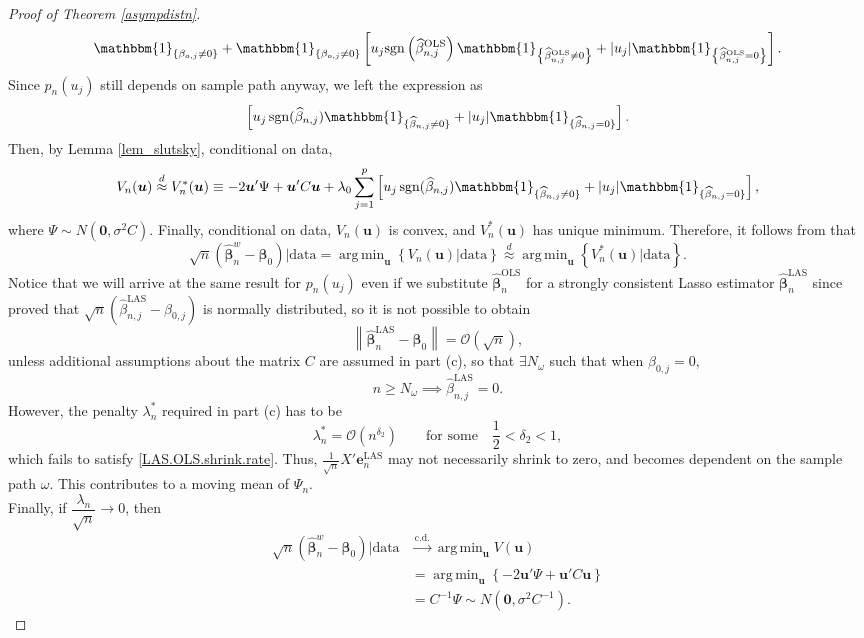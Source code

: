 \documentclass[12pt]{article}
\DeclareMathOperator*{\argmin}{arg\,min} %
\newcommand{\bnw}{\widehat{\bm{\beta}}_n^w} %
\newcommand{\bLAS}{\widehat{\bm{\beta}}_n^{\text{LAS}}} %
\newcommand{\bLS}{\widehat{\bm{\beta}}_n^{\text{OLS}}} %
\newcommand{\be}{\bm{\beta}} %
\newcommand{\dqn}{\frac{1}{\sqrt{n}}} %
\newcommand{\CONV}[1]{\stackrel{\text{#1}}{\longrightarrow}} %
\newcommand{\bu}{\bm{u}} %
\begin{document}
\begin{proof} [Proof of Theorem \ref{asympdistn}]
$$	\mathbbm{1}_{ 
		\left\{ 
		\beta_{o,j} \neq 0 
		\right\} 
	} + 
	\mathbbm{1}_{ 
				\left\{ 
						\beta_{o,j} \neq 0 
				\right\} 
				}
	\left[
		u_j \text{sgn} 
		\left( \widehat{\beta}_{n,j}^{\text{OLS}} \right)
		\mathbbm{1}_{ 
					\left\{ 
						\widehat{\beta}_{n,j}^{\text{OLS}} \neq 0 
					\right\} 
					}
		+ |u_j| 
		\mathbbm{1}_{ 
					\left\{ 
						\widehat{\beta}_{n,j}^{\text{OLS}} = 0 
					\right\} 
					} 
	\right].
	$$
	Since $p_n(u_j)$ still depends on sample path anyway, we left the expression as
	$$
	\left[
		u_j \, \text{sgn}(\widehat{\beta}_{n,j}) 
		\mathbbm{1}_{ \{ \widehat{\beta}_{n,j} \neq 0 \}}
		+ | u_j | \mathbbm{1}_{ \{ \widehat{\beta}_{n,j} = 0 \}} 
	\right].
	$$  
	Then, by Lemma \ref{lem_slutsky}, conditional on data, 
	$$
	V_n(\bu) \stackrel{d}{\approx}  V_n^*(\bu) \equiv 
	-2 \bu' \Psi 
	+ \bu' C \bu
	+ \lambda_0 
	  \sum_{j=1}^p
	  \left[
	  	u_j \, \text{sgn}(\widehat{\beta}_{n,j}) 
	 	 \mathbbm{1}_{ \{ \widehat{\beta}_{n,j} \neq 0 \}}
	  	+ | u_j | \mathbbm{1}_{ \{ \widehat{\beta}_{n,j} = 0 \}} 
	  \right], 
	$$
	where $\Psi \sim N \left( \bm{0}, \sigma^2 C \right)$. Finally, conditional on data, $V_n(\bu)$ is convex, and $V_n^*(\bu)$ has unique minimum. Therefore, it follows from \citet{Geyer1996} that
	$$
	\sqrt{n} \left( \bnw - \be_0 \right) \bigg| \text{data}
	= \argmin_{\bu} \left\{ V_n(\bu) \big| \text{data} \right\}
		\stackrel{d}{\approx}
		\argmin_{\bu} 
		\left\{
				V_n^*(\bu) 
				\big| \text{data}
		\right\}.
	$$ 
	Notice that we will arrive at the same result for $p_n(u_j)$ even if we substitute $\bLS$ for a strongly consistent Lasso estimator $\bLAS$ since \citet{Knight&Fu} proved that $\sqrt{n} \left( \widehat{\beta}_{n,j}^{\text{LAS}} - \beta_{0,j} \right)$ is normally distributed, so it is not possible to obtain 
	$$
	\left\|
			\bLAS - \be_0
	\right\|  
	= \mathcal{O} (\sqrt{n}),
	$$
	unless additional assumptions about the matrix $C$ are assumed in part (c), so that $\exists N_\omega$ such that when $\beta_{0,j} = 0 $,
	$$
	n \geq N_\omega
	\implies 
	\widehat{\beta}_{n,j}^{\text{LAS}} = 0. 
	$$
	However, the penalty $\lambda_n^*$ required in part (c) has to be
	$$
	\lambda_n^* 
	= \mathcal{O} ( n ^ {\delta_2} )
	\qquad \text{for some} \quad
	\frac{1}{2} < \delta_2 < 1,	
	$$   
	which fails to satisfy \eqref{LAS.OLS.shrink.rate}. Thus, $\dqn X' \bm{e}_n^{\text{LAS}}$ may not necessarily shrink to zero, and becomes dependent on the sample path $\omega$. This contributes to a moving mean of $\Psi_n$. \\
	
	Finally, if $\dfrac{\lambda_n}{\sqrt{n}} \to 0$, then
	\begin{align*}
	\sqrt{n} \left( \bnw - \be_0 \right) \bigg| \text{data}
	&\CONV{c.d.} \argmin_{\bu} V(\bu) \\
	&= \argmin_{\bu} \left\{ 
						- 2 \bu' \Psi + \bu' C \bu 
					\right\}  \\
	&= C^{-1} \Psi \sim N (\bm{0}, \sigma^2 C^{-1}).
	\end{align*}
\end{proof}
   
\end{document}

